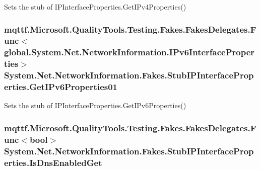 Sets the stub of I\-P\-Interface\-Properties.\-Get\-I\-Pv4\-Properties()

\hypertarget{class_system_1_1_net_1_1_network_information_1_1_fakes_1_1_stub_i_p_interface_properties_a2dd417e8224938ec6ae7990cc9d4b9c8}{
\subsubsection[{Get\-I\-Pv6\-Properties01}]{\setlength{\rightskip}{0pt plus 5cm}mqttf.\-Microsoft.\-Quality\-Tools.\-Testing.\-Fakes.\-Fakes\-Delegates.\-Func$<$global.\-System.\-Net.\-Network\-Information.\-I\-Pv6\-Interface\-Properties$>$ System.\-Net.\-Network\-Information.\-Fakes.\-Stub\-I\-P\-Interface\-Properties.\-Get\-I\-Pv6\-Properties01}}\label{class_system_1_1_net_1_1_network_information_1_1_fakes_1_1_stub_i_p_interface_properties_a2dd417e8224938ec6ae7990cc9d4b9c8}


Sets the stub of I\-P\-Interface\-Properties.\-Get\-I\-Pv6\-Properties()

\hypertarget{class_system_1_1_net_1_1_network_information_1_1_fakes_1_1_stub_i_p_interface_properties_a46704fa65f0750341e99728061484681}{
\subsubsection[{Is\-Dns\-Enabled\-Get}]{\setlength{\rightskip}{0pt plus 5cm}mqttf.\-Microsoft.\-Quality\-Tools.\-Testing.\-Fakes.\-Fakes\-Delegates.\-Func$<$bool$>$ System.\-Net.\-Network\-Information.\-Fakes.\-Stub\-I\-P\-Interface\-Properties.\-Is\-Dns\-Enabled\-Get}}\label{class_system_1_1_net_1_1_network_information_1_1_fakes_1_1_stub_i_p_interface_properties_a46704fa65f0750341e99728061484681}


